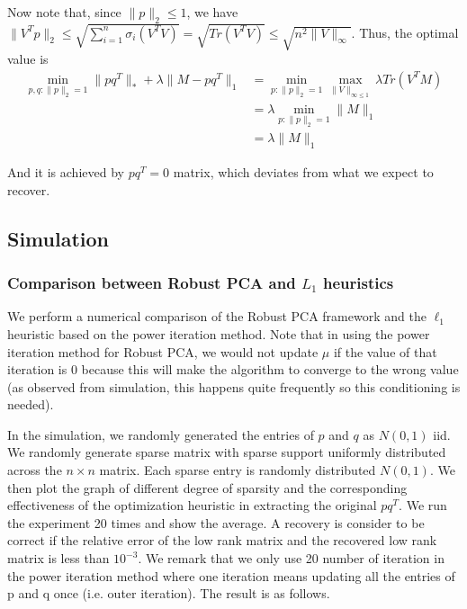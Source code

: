 Now note that, since $\|p\|_{2}\le1$, we have $\|V^{T}p\|_{2}\le\sqrt{\sum_{i=1}^{n}\sigma_{i}(V^{T}V)}=\sqrt{Tr(V^{T}V)}\le\sqrt{n^{2}\|V\|_{\infty}}$.
Thus, the optimal value is
\begin{align*}
\min_{p,q:\|p\|_{2}=1}\|pq^{T}\|_{*}+\lambda\|M-pq^{T}\|_{1}
& = \min_{p:\|p\|_{2}=1}\max_{\|V\|_{\infty\le1}}\lambda Tr(V^{T}M)\\
& = \lambda \min_{p:\|p\|_{2}=1}\|M\|_{1}\\
& = \lambda \|M\|_{1}
\end{align*}


And it is achieved by $pq^{T}=0$ matrix, which deviates from what
we expect to recover.


\subsection{Simulation }


\subsubsection{Comparison between Robust PCA and $L_{1}$ heuristics}

We perform a numerical comparison of the Robust PCA framework and the $\ell_{1}$ heuristic based on the power iteration method. Note that in using the power iteration method for Robust PCA, we would not update $\mu$ if the value of that iteration is 0 because this will make the algorithm to converge to the wrong value (as observed from simulation, this happens quite frequently so this conditioning is needed).

In the simulation, we randomly generated the entries of $p$ and $q$ as $N(0,1)$ iid. We randomly generate sparse matrix with sparse support uniformly distributed across the $n \times n$ matrix. Each sparse entry is randomly distributed $N(0,1)$. We then plot the graph of different degree of sparsity and the corresponding effectiveness of the optimization heuristic in extracting the original $pq^{T}$. We run the experiment 20 times and show the average. A recovery is consider to be correct if the relative error of the low rank matrix and the recovered low rank matrix is less than $10^{-3}$. We remark that we only use 20 number of iteration in the power iteration method where one iteration means updating all the entries of p and q once (i.e. outer iteration). The result is as follows.

